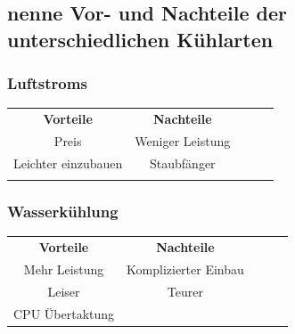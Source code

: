 \documentclass[a4paper]{article}
\begin{document}
    \subsection{\color{red}nenne Vor- und Nachteile der unterschiedlichen Kühlarten}\label{subsec:color{red}nenne-vor--und-nachteile-der-unterschiedlichen-kühlarten}

    \subsubsection{\color{codegreen}Luftstroms}
    \begin{center}
        \begin{tabular}{cclll}
            \cline{1-2}
            \multicolumn{1}{|c|}{\textbf{Vorteile}}                          & \multicolumn{1}{c|}{\textbf{Nachteile}}                      &  &  &  \\ \cline{1-2}
            \multicolumn{1}{|c|}{{\color[HTML]{32CB00} Preis}}               & \multicolumn{1}{c|}{{\color[HTML]{F56B00} Weniger Leistung}} &  &  &  \\ \cline{1-2}
            \multicolumn{1}{|c|}{{\color[HTML]{32CB00} Leichter einzubauen}} & \multicolumn{1}{c|}{{\color[HTML]{F56B00} Staubfänger}}      &  &  &  \\ \cline{1-2}
            \multicolumn{1}{l}{}                                             & \multicolumn{1}{l}{}                                         & & &
        \end{tabular}
    \end{center}

    \subsubsection{\color{codegreen}Wasserkühlung}
    \begin{center}
        \begin{tabular}{|c|clll}
            \cline{1-2}
            \textbf{Vorteile}                                            & \multicolumn{1}{c|}{\textbf{Nachteile}}                          & & & \\ \cline{1-2}
            {\color[HTML]{32CB00} Mehr Leistung}                         & \multicolumn{1}{c|}{{\color[HTML]{F56B00} Komplizierter Einbau}} &  &  &  \\ \cline{1-2}
            {\color[HTML]{32CB00} Leiser}                                & \multicolumn{1}{c|}{{\color[HTML]{F56B00} Teurer}}               &  &  &  \\ \cline{1-2}
            \multicolumn{1}{|l|}{{\color[HTML]{32CB00} CPU Übertaktung}} & \multicolumn{1}{l}{}                                             &  &  &  \\ \cline{1-1}
        \end{tabular}
    \end{center}
\end{document}
